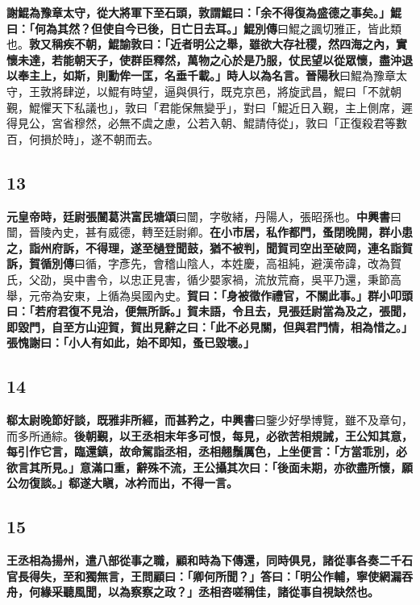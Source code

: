 \textbf{謝鯤為豫章太守，從大將軍下至石頭，敦謂鯤曰：「余不得復為盛德之事矣。」鯤曰：「何為其然？但使自今已後，日亡日去耳。」}{\footnotesize \textbf{鯤別傳}曰鯤之諷切雅正，皆此類也。}\textbf{敦又稱疾不朝，鯤諭敦曰：「近者明公之舉，雖欲大存社稷，然四海之內，實懷未達，若能朝天子，使群臣釋然，萬物之心於是乃服，仗民望以從眾懷，盡沖退以奉主上，如斯，則勳侔一匡，名垂千載。」時人以為名言。}{\footnotesize \textbf{晉陽秋}曰鯤為豫章太守，王敦將肆逆，以鯤有時望，逼與俱行，既克京邑，將旋武昌，鯤曰「不就朝覲，鯤懼天下私議也」，敦曰「君能保無變乎」，對曰「鯤近日入覲，主上側席，遲得見公，宮省穆然，必無不虞之慮，公若入朝、鯤請侍從」，敦曰「正復殺君等數百，何損於時」，遂不朝而去。}

\subsection*{13}

\textbf{元皇帝時，廷尉張闓}{\footnotesize \textbf{葛洪富民塘頌}曰闓，字敬緒，丹陽人，張昭孫也。\textbf{中興書}曰闓，晉陵內史，甚有威德，轉至廷尉卿。}\textbf{在小市居，私作都門，蚤閉晚開，群小患之，詣州府訴，不得理，遂至檛登聞鼓，猶不被判，聞賀司空出至破岡，連名詣賀訴，}{\footnotesize \textbf{賀循別傳}曰循，字彥先，會稽山陰人，本姓慶，高祖純，避漢帝諱，改為賀氏，父劭，吳中書令，以忠正見害，循少嬰家禍，流放荒裔，吳平乃還，秉節高舉，元帝為安東，上循為吳國內史。}\textbf{賀曰：「身被徵作禮官，不關此事。」群小叩頭曰：「若府君復不見治，便無所訴。」賀未語，令且去，見張廷尉當為及之，張聞，即毀門，自至方山迎賀，賀出見辭之曰：「此不必見關，但與君門情，相為惜之。」張愧謝曰：「小人有如此，始不即知，蚤已毀壞。」}

\subsection*{14}

\textbf{郗太尉晚節好談，既雅非所經，而甚矜之，}{\footnotesize \textbf{中興書}曰鑒少好學博覽，雖不及章句，而多所通綜。}\textbf{後朝覲，以王丞相末年多可恨，每見，必欲苦相規誡，王公知其意，每引作它言，臨還鎮，故命駕詣丞相，丞相翹鬚厲色，上坐便言：「方當乖別，必欲言其所見。」意滿口重，辭殊不流，王公攝其次曰：「後面未期，亦欲盡所懷，願公勿復談。」郗遂大瞋，冰衿而出，不得一言。}

\subsection*{15}

\textbf{王丞相為揚州，遣八部從事之職，顧和時為下傳還，同時俱見，諸從事各奏二千石官長得失，至和獨無言，王問顧曰：「卿何所聞？」答曰：「明公作輔，寧使網漏吞舟，何緣采聽風聞，以為察察之政？」丞相咨嗟稱佳，諸從事自視缺然也。}

